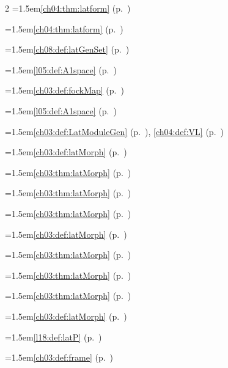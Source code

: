 \begin{multicols}{2}
\hangindent=1.5em\quad \ref{ch04:thm:latform} (p.~\pageref{ch04:thm:latform})\par
\hangindent=1.5em\quad \ref{ch04:thm:latform} (p.~\pageref{ch04:thm:latform})\par
\hangindent=1.5em\quad \ref{ch08:def:latGenSet} (p.~\pageref{ch08:def:latGenSet})\par
\hangindent=1.5em\quad \ref{l05:def:A1space} (p.~\pageref{l05:def:A1space})\par
\hangindent=1.5em\quad \ref{ch03:def:fockMap} (p.~\pageref{ch03:def:fockMap})\par
\hangindent=1.5em\quad \ref{l05:def:A1space} (p.~\pageref{l05:def:A1space})\par
\hangindent=1.5em\quad \ref{ch03:def:LatModuleGen} (p.~\pageref{ch03:def:LatModuleGen}), \ref{ch04:def:VL} (p.~\pageref{ch04:def:VL})\par
\hangindent=1.5em\quad \ref{ch03:def:latMorph} (p.~\pageref{ch03:def:latMorph})\par
\hangindent=1.5em\quad \ref{ch03:thm:latMorph} (p.~\pageref{ch03:thm:latMorph})\par
\hangindent=1.5em\quad \ref{ch03:thm:latMorph} (p.~\pageref{ch03:thm:latMorph})\par
\hangindent=1.5em\quad \ref{ch03:thm:latMorph} (p.~\pageref{ch03:thm:latMorph})\par
\hangindent=1.5em\quad \ref{ch03:def:latMorph} (p.~\pageref{ch03:def:latMorph})\par
\hangindent=1.5em\quad \ref{ch03:thm:latMorph} (p.~\pageref{ch03:thm:latMorph})\par
\hangindent=1.5em\quad \ref{ch03:thm:latMorph} (p.~\pageref{ch03:thm:latMorph})\par
\hangindent=1.5em\quad \ref{ch03:thm:latMorph} (p.~\pageref{ch03:thm:latMorph})\par
\hangindent=1.5em\quad \ref{ch03:def:latMorph} (p.~\pageref{ch03:def:latMorph})\par
\hangindent=1.5em\quad \ref{l18:def:latP} (p.~\pageref{l18:def:latP})\par
\hangindent=1.5em\quad \ref{ch03:def:frame} (p.~\pageref{ch03:def:frame})\par

\end{multicols}
